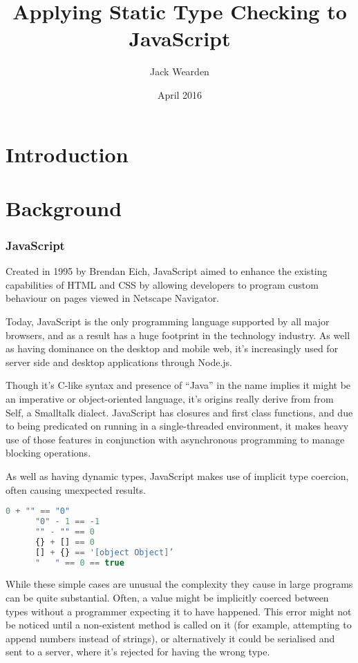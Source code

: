 \documentclass[british, twoside]{bhamthesis}
\title{Applying Static Type Checking to JavaScript}
\author{Jack Wearden}
\date{April 2016}  %
\theoremstyle{definition}
\begin{document}
\maketitle

\begin{abstract}
\end{abstract}

\tableofcontents

\chapter{Introduction}

\chapter{Background}

  \subsection{JavaScript}
    Created in 1995 by Brendan Eich, JavaScript aimed to enhance the existing capabilities of HTML and CSS by allowing developers to program custom behaviour on pages viewed in Netscape Navigator.

    Today, JavaScript is the only programming language supported by all major browsers, and as a result has a huge footprint in the technology industry. As well as having dominance on the desktop and mobile web, it's increasingly used for server side and desktop applications through Node.js.

    Though it’s C-like syntax and presence of “Java” in the name implies it might be an imperative or object-oriented language, it’s origins really derive from from Self, a Smalltalk dialect. JavaScript has closures and first class functions, and due to being predicated on running in a single-threaded environment, it makes heavy use of those features in conjunction with asynchronous programming to manage blocking operations.

    As well as having dynamic types, JavaScript makes use of implicit type coercion, often causing unexpected results.

    \begin{lstlisting}[language=JavaScript]
      0 + "" == "0"
      "0" - 1 == -1
      "" - "" == 0
      {} + [] == 0
      [] + {} == '[object Object]’
      "   " == 0 == true
    \end{lstlisting}

    While these simple cases are unusual the complexity they cause in large programs can be quite substantial. Often, a value might be implicitly coerced between types without a programmer expecting it to have happened. This error might not be noticed until a non-existent method is called on it (for example, attempting to append numbers instead of strings), or alternatively it could be serialised and sent to a server, where it's rejected for having the wrong type.
\end{document}
